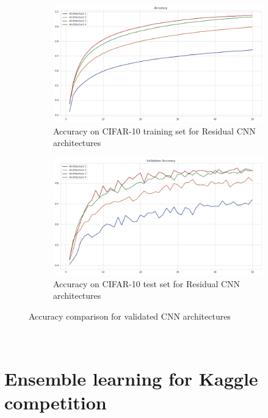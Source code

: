 \documentclass{article}
\begin{document}
\begin{figure}[!h]
\begin{subfigure}{.5\textwidth}
  \centering
  \includegraphics[width=1\linewidth]{resnet_experimentaccuracy.png}  
  \caption{Accuracy on CIFAR-10 training set for Residual CNN architectures}
  \label{fig:sub-first}
\end{subfigure}
\begin{subfigure}{.5\textwidth}
  \centering
  \includegraphics[width=1\linewidth]{resnet_experimentval_accuracy.png}  
  \caption{Accuracy on CIFAR-10 test set for Residual CNN architectures}
  \label{fig:sub-second}
\end{subfigure}
\caption{Accuracy comparison for validated CNN architectures}
\label{plots_loss}
\end{figure}

$\phantom{.}$

\newpage
\section{Ensemble learning for Kaggle competition}
\end{document}
